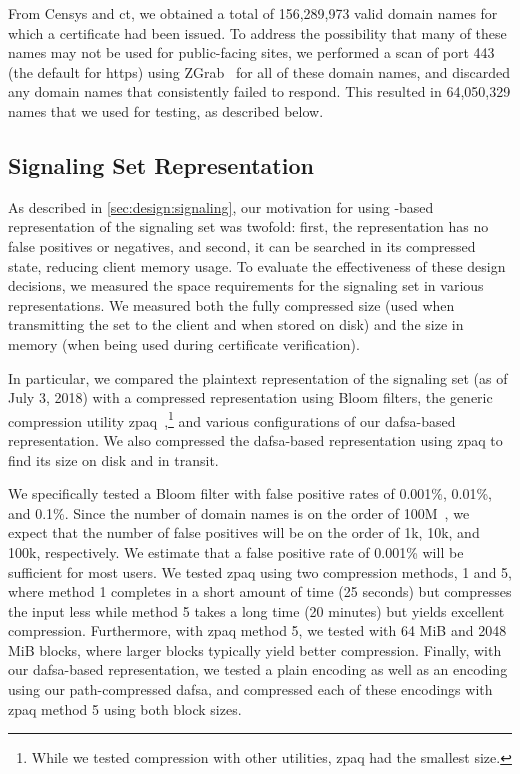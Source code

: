From Censys and \ac{ct}, we obtained a total of 156,289,973 valid domain names
for which a certificate had been issued. To address the possibility that many of
these names may not be used for public-facing sites, we performed a scan of port
443 (the default for \ac{https}) using ZGrab~\cite{durumeric2015search} for all
of these domain names, and discarded any domain names that consistently failed
to respond. This resulted in 64,050,329 names that we used for testing, as
described below.

\subsection{Signaling Set Representation}
\label{sec:evaluation:implementation}

As described in \autoref{sec:design:signaling}, our motivation for using
-based representation of the signaling set was twofold: first, the
representation has no false positives or negatives, and second, it can be
searched in its compressed state, reducing client memory usage. 
To evaluate the effectiveness of these design decisions, we
measured the space requirements for the signaling set
in various representations. We measured both the fully compressed size (used
when transmitting the set to the client and when stored on disk) and the size in
memory (when being used during certificate verification).

In particular, we compared the plaintext representation of the signaling set (as
of July 3, 2018) with a compressed representation using Bloom filters, the
generic compression utility zpaq~\cite{zpaq},\footnote{While we tested
  compression with other utilities, zpaq had the smallest size.} and
various configurations of our \ac{dafsa}-based representation. We also
compressed the \ac{dafsa}-based representation using zpaq to find its size on
disk and in transit. 

We specifically tested a Bloom filter with false positive rates of 0.001\%,
0.01\%, and 0.1\%. Since the number of domain names is on the order of
100M~\cite{dnib-14-1}, we expect that the number of false positives will be on
the order of 1k, 10k, and 100k, respectively. We estimate that a false positive
rate of 0.001\% will be sufficient for most users. We tested zpaq using two
compression methods, 1 and 5, where method 1 completes in a short amount of time
(25 seconds) but compresses the input less while method 5 takes a long time (20
minutes) but yields excellent compression. Furthermore, with zpaq method 5, we
tested with 64 MiB and 2048 MiB blocks, where larger blocks typically yield
better compression. Finally, with our \ac{dafsa}-based representation, we tested
a plain encoding as well as an encoding using our path-compressed \ac{dafsa},
and compressed each of these encodings with zpaq method 5 using both block
sizes.

